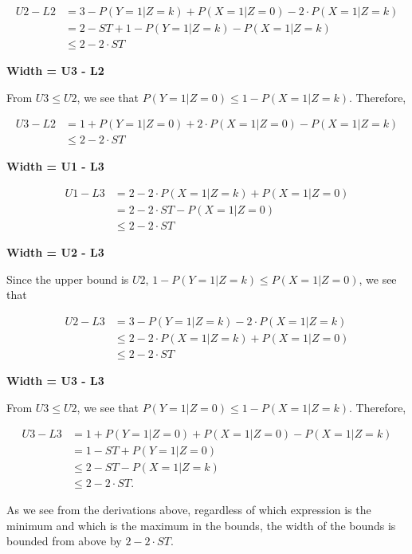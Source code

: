 \documentclass[
]{article}
\theoremstyle{plain}
\begin{document}
\[\begin{aligned}
U2 - L2 &= 3 - P(Y = 1 | Z = k) + P(X = 1 | Z = 0) - 2\cdot P(X = 1 | Z = k) \\
        &= 2 - ST + 1 - P(Y = 1 | Z = k) - P(X = 1 | Z = k) \\
        &\le 2 - 2\cdot ST
\end{aligned}\]

\textbf{Width = U3 - L2}

From \(U3 \le U2\), we see that \(P(Y = 1 | Z = 0) \le 1 - P(X = 1 | Z = k)\). Therefore,

\[\begin{aligned}
U3 - L2 &= 1 + P(Y = 1 | Z = 0) + 2\cdot P(X = 1 | Z = 0) - P(X = 1 | Z = k) \\
        &\le 2 - 2\cdot ST
\end{aligned}\]

\textbf{Width = U1 - L3}

\[\begin{aligned}
U1 - L3 &= 2 - 2\cdot P(X = 1 | Z = k) + P(X = 1 | Z = 0) \\
        &= 2 - 2\cdot ST - P(X = 1 | Z = 0) \\
        &\le 2 - 2\cdot ST
\end{aligned}\]

\textbf{Width = U2 - L3}

Since the upper bound is \(U2\), \(1 - P(Y = 1 | Z = k) \le P(X = 1 | Z = 0)\), we see that

\[\begin{aligned}
U2 - L3 &= 3 - P(Y = 1 | Z = k) - 2\cdot P(X = 1 | Z = k) \\
        &\le 2 - 2\cdot P(X = 1 | Z = k) + P(X = 1 | Z = 0) \\
        &\le 2 - 2\cdot ST
\end{aligned}\]

\textbf{Width = U3 - L3}

From \(U3 \le U2\), we see that \(P(Y = 1 | Z = 0) \le 1 - P(X = 1 | Z = k)\). Therefore,

\[\begin{aligned}
U3 - L3 &= 1 + P(Y = 1 | Z = 0) + P(X = 1 | Z = 0) - P(X = 1 | Z = k)\\
        &= 1 - ST + P(Y = 1 | Z = 0) \\
        &\le 2 - ST - P(X = 1 | Z = k) \\
        &\le 2 - 2\cdot ST.
\end{aligned}\]

As we see from the derivations above, regardless of which expression is the minimum and which is the maximum in the bounds, the width of the bounds is bounded from above by \(2 - 2\cdot ST\).
\end{document}
